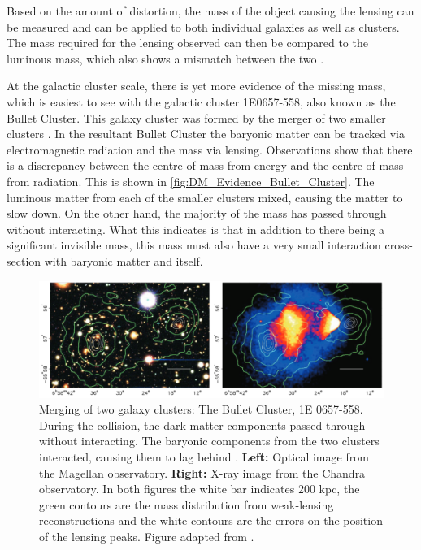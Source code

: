 \par
Based on the amount of distortion, the mass of the object causing the lensing can be measured and can be applied to both individual galaxies as well as clusters.
The mass required for the lensing observed can then be compared to the luminous mass, which also shows a mismatch between the two \cite{History_Of_Dark_Matter_2018_ref}.


\par
At the galactic cluster scale, there is yet more evidence of the missing mass, which is easiest to see with the galactic cluster 1E0657-558, also known as the Bullet Cluster.
This galaxy cluster was formed by the merger of two smaller clusters \cite{bullet_cluster_ref}.
In the resultant Bullet Cluster the baryonic matter can be tracked via electromagnetic radiation and the mass via lensing.
Observations show that there is a discrepancy between the centre of mass from energy and the centre of mass from radiation.
This is shown in \autoref{fig:DM_Evidence_Bullet_Cluster}.
The luminous matter from each of the smaller clusters mixed, causing the matter to slow down.
On the other hand, the majority of the mass has passed through without interacting.
What this indicates is that in addition to there being a significant invisible mass, this mass must also have a very small interaction cross-section with baryonic matter and itself.

\begin{figure}%
    \centering
     \includegraphics[width=\textwidth]{Figures/DarkMatterEvidence/bullet_cluster_2.png}
    \caption[Merging of two galaxy cluster, 1E 0657-558]{Merging of two galaxy clusters: The Bullet Cluster, 1E 0657-558.
             During the collision, the dark matter components passed through without interacting.
             The baryonic components from the two clusters interacted, causing them to lag behind .
             \textbf{Left:} Optical image from the Magellan observatory.
             \textbf{Right:} X-ray image from the Chandra observatory.
             In both figures the white bar indicates 200 kpc, the green contours are the mass distribution from weak-lensing reconstructions and the white contours are the errors on the position of the lensing peaks.
             Figure adapted from \cite{bullet_cluster_ref}.}
    \label{fig:DM_Evidence_Bullet_Cluster}
\end{figure}


